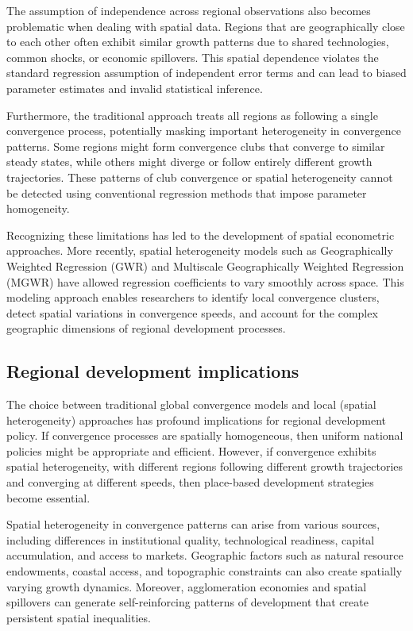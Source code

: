 \documentclass[smallextended, natbib]{svjour3}       %
\begin{document}
The assumption of independence across regional observations also becomes problematic when dealing with spatial data. 
Regions that are geographically close to each other often exhibit similar growth patterns due to shared technologies, common shocks, or economic spillovers. 
This spatial dependence violates the standard regression assumption of independent error terms and can lead to biased parameter estimates and invalid statistical inference.

Furthermore, the traditional approach treats all regions as following a single convergence process, potentially masking important heterogeneity in convergence patterns. 
Some regions might form convergence clubs that converge to similar steady states, while others might diverge or follow entirely different growth trajectories. 
These patterns of club convergence or spatial heterogeneity cannot be detected using conventional regression methods that impose parameter homogeneity.

Recognizing these limitations has led to the development of spatial econometric approaches.
More recently, spatial heterogeneity models such as Geographically Weighted Regression (GWR) and Multiscale Geographically Weighted Regression (MGWR) have allowed regression coefficients to vary smoothly across space.
This modeling approach enables researchers to identify local convergence clusters, detect spatial variations in convergence speeds, and account for the complex geographic dimensions of regional development processes.

\subsection{Regional development implications}

The choice between traditional global convergence models and local (spatial heterogeneity) approaches has profound implications for regional development policy. 
If convergence processes are spatially homogeneous, then uniform national policies might be appropriate and efficient.
However, if convergence exhibits spatial heterogeneity, with different regions following different growth trajectories and converging at different speeds, then place-based development strategies become essential.

Spatial heterogeneity in convergence patterns can arise from various sources, including differences in institutional quality, technological readiness, capital accumulation, and access to markets. 
Geographic factors such as natural resource endowments, coastal access, and topographic constraints can also create spatially varying growth dynamics. 
Moreover, agglomeration economies and spatial spillovers can generate self-reinforcing patterns of development that create persistent spatial inequalities.
\end{document}
